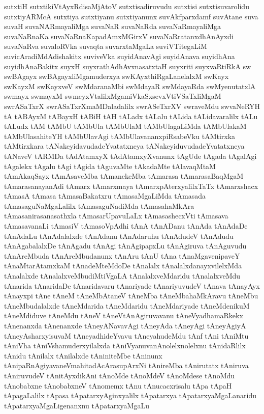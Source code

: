 {sutxtiH
sutxtikiVtAyxRdisaMjAtoV
sutxtisadiruvudu
sutxtisi
sutxtisuvarolidu
sutxtiyARMcA
sutxtiya
sutxtiyanu
sutxtiyanunx
suvAkfparxdamf
suvAtane
suva
suvaH
suvaNARmayaliMga
suvaNaR
suvaNaRda
suvaNaRmayaliMga
suvaNaRnaKa
suvaNaRnaKapadAmxMGirxV
suvaNaRratanxdhAnAyxdi
suvaNaRva
suvaloRVka
suvaqta
suvarxtaMgaLa
suviVTitegaLiM
suvicAradiMdAdishakitx
suviveVka
suyidAnavAgi
suyidAnava
suyidhAna
suyidhAnaBakitx
suyxH
suyxrathAdhAvxnasatxtaH
suyxriti
suyxvaRtiRkA
sw
swBAgayx
swBAgayxliMgamuderxya
swKAyxthiRgaLanelalxM
swKayx
swKayxM
swKayxveV
swMdaranaMbi
swMdayaR
swMdayaRda
swMyenutatxlA
swmayx
swmayxM
swmeyxVtalilxMgamiVkaSxsevxVtiVSaTxliMgaM
swrASaTxrX
swrASaTxrXmaMDaladalilx
swrASeTxrXV
swraveMdu
swvaNeRYH
tA
tABAyxM
tABayxH
tABiH
tAH
tALadx
tALalu
tALida
tALidavaralilx
tALu
tALudx
tAM
tAMbU
tAMbUla
tAMbUlaM
tAMbUlagaLiMda
tAMbUlakaM
tAMbUlasahiteYH
tAMbUlavAgi
tAMbUlavananxpiRsabeVku
tAMtirxka
tAMtirxkara
tANakeyidavudadeYvatatxneya
tANakeyiduvudadeYvatatxneya
tANaveV
tARMDa
tAdAtamxyX
tAdAtamxyXvanunx
tAgUde
tAgada
tAgalAgi
tAgalekx
tAgalu
tAgi
tAgida
tAguvaMte
tAkadaMte
tAlavaqMtaM
tAmAkaqSayx
tAmAsaveMba
tAmanekeMba
tAmarasa
tAmarasaBaqMgaM
tAmarasanayanAdi
tAmarx
tAmarxmaya
tAmarxpAterxyalilxTaTx
tAmarxshacx
tAmasA
tAmasa
tAmasaBakatxru
tAmasaMgaLiMda
tAmasada
tAmasaguNaMgaLalilx
tAmasaguNadiMda
tAmasahaMkAra
tAmasanirasanasathxla
tAmasarUpavuLaLx
tAmasashecxVti
tAmasava
tAmasavanaLi
tAmasiV
tAmasoVpAdhi
tAnA
tAnADanu
tAnAda
tAnAdaDe
tAnAdaLu
tAnAdalalxde
tAnAdanu
tAnAdaruhu
tAnAdudeV
tAnAdudu
tAnAgabalalxDe
tAnAgadu
tAnAgi
tAnAgipapxLu
tAnAgiruva
tAnAguvudu
tAnAreMbuda
tAnAreMbudanunx
tAnAru
tAnU
tAna
tAnaMgavenipaveY
tAnaMtarAtamxkaM
tAnadeMteMdoDe
tAnalalx
tAnalalxdanayxvilelxMda
tAnalalxde
tAnalalxveMbudiMtiVgaLA
tAnalalxveMdaridu
tAnalalxveMdu
tAnarida
tAnaridaDe
tAnaridavaru
tAnariyade
tAnariyuvudeV
tAnava
tAnayAyx
tAnayxpi
tAne
tAneM
tAneMbAtaneV
tAneMba
tAneMbahaMkAravu
tAneMbu
tAneMbudalalxde
tAneMdarida
tAneMdaridu
tAneMdariyade
tAneMdenikuM
tAneMdiduve
tAneMdu
tAneV
tAneVtAnAgiruvavanu
tAneVyadhamaRkekx
tAnenanxda
tAnenanxde
tAneyANavavAgi
tAneyAda
tAneyAgi
tAneyAgiyA
tAneyAsharxyisuvaM
tAneyadhideYvavu
tAneyahudeMdu
tAnf
tAni
tAniMtu
tAniVha
tAniVshamuderxyilalxda
tAniVyanuvanAnolelxnolelxnu
tAnidaRlilx
tAnidu
tAnilalx
tAnilalxde
tAniniteMbe
tAninunx
tAnipaRnAgiyavaneVmahitadAcArasupArxNi
tAnireMba
tAnirutatx
tAniruva
tAniruvudeV
tAnitAyxdikAni
tAnoMde
tAnoMdeV
tAnoMdese
tAnoMdu
tAnobabxne
tAnobabxneV
tAnomemx
tAnu
tAnucacxrisalu
tApa
tApaH
tApagaLalilx
tApasa
tApatarxyAginxyalilx
tApatarxya
tApatarxyaMgaLanaridu
tApatarxyaMgaLigenanxnu
tApatarxyaMgaLu
}
